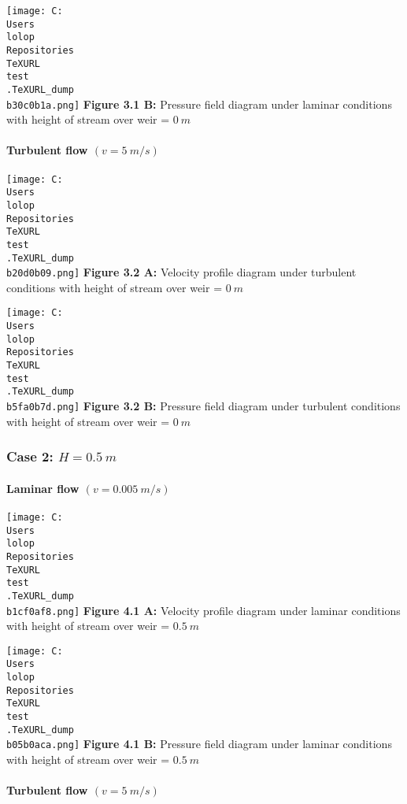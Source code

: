\documentclass[11pt]{article}
\begin{document}
\texttt{[image: C:\\Users\\lolop\\Repositories\\TeXURL\\test\\.TeXURL\_dump\\b30c0b1a.png]} \textbf{Figure 3.1 B:}
Pressure field diagram under laminar conditions with height of stream
over weir = \(0\ m\)

\hypertarget{turbulent-flow-v-5-ms}{%
\paragraph{\texorpdfstring{Turbulent flow
\((v = 5\ m/s)\)}{Turbulent flow (v = 5\textbackslash{} m/s)}}\label{turbulent-flow-v-5-ms}}

\texttt{[image: C:\\Users\\lolop\\Repositories\\TeXURL\\test\\.TeXURL\_dump\\b20d0b09.png]} \textbf{Figure 3.2 A:}
Velocity profile diagram under turbulent conditions with height of
stream over weir = \(0\ m\)

\texttt{[image: C:\\Users\\lolop\\Repositories\\TeXURL\\test\\.TeXURL\_dump\\b5fa0b7d.png]} \textbf{Figure 3.2 B:}
Pressure field diagram under turbulent conditions with height of stream
over weir = \(0\ m\)

\hypertarget{case-2-h-0.5-m-1}{%
\subsubsection{\texorpdfstring{Case 2:
\(H = 0.5\ m\)}{Case 2: H = 0.5\textbackslash{} m}}\label{case-2-h-0.5-m-1}}

\hypertarget{laminar-flow-v-0.005-ms-1}{%
\paragraph{\texorpdfstring{Laminar flow
\((v = 0.005\ m/s)\)}{Laminar flow (v = 0.005\textbackslash{} m/s)}}\label{laminar-flow-v-0.005-ms-1}}

\texttt{[image: C:\\Users\\lolop\\Repositories\\TeXURL\\test\\.TeXURL\_dump\\b1cf0af8.png]} \textbf{Figure 4.1 A:}
Velocity profile diagram under laminar conditions with height of stream
over weir = \(0.5\ m\)

\texttt{[image: C:\\Users\\lolop\\Repositories\\TeXURL\\test\\.TeXURL\_dump\\b05b0aca.png]} \textbf{Figure 4.1 B:}
Pressure field diagram under laminar conditions with height of stream
over weir = \(0.5\ m\)

\hypertarget{turbulent-flow-v-5-ms-1}{%
\paragraph{\texorpdfstring{Turbulent flow
\((v = 5\ m/s)\)}{Turbulent flow (v = 5\textbackslash{} m/s)}}\label{turbulent-flow-v-5-ms-1}}
\end{document}
